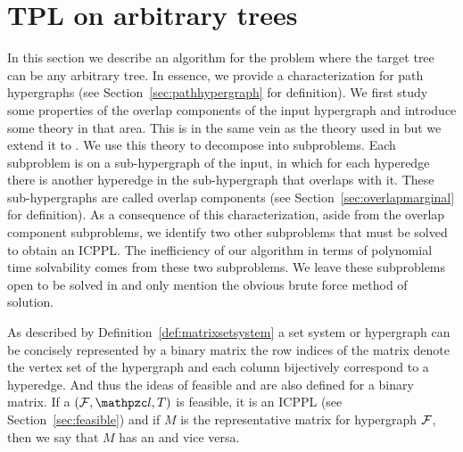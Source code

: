 \section{ TPL on arbitrary trees}
\label{sec:norestraint}

In this section we describe an algorithm for the \CFTPL problem where
the target tree can be any arbitrary tree. In essence, we provide a
characterization for path hypergraphs (see
Section~\ref{sec:pathhypergraph} for definition).  We first study some
properties of the overlap components of the input hypergraph and
introduce some theory in that area. This is in the same vein as the
theory used in \cite{wlh02,nsnrs09} but we extend it to \TPL.  We use
this theory to decompose \CFTPL into subproblems.  Each subproblem is
on a sub-hypergraph of the input, in which for each hyperedge there is
another hyperedge in the sub-hypergraph that overlaps with it. These
sub-hypergraphs are called overlap components (see
Section~\ref{sec:overlapmarginal} for definition). As a consequence of
this characterization, aside from the overlap component subproblems,
we identify two other subproblems that must be solved to obtain an
ICPPL.  The inefficiency of our algorithm in terms of polynomial time
solvability comes from these two subproblems. We leave these subproblems
open to be solved in \p and only mention the obvious brute force
method of solution.





As described by Definition~\ref{def:matrixsetsystem} a set system or
hypergraph can be concisely represented by a binary matrix \stt the
row indices of the matrix denote the vertex set of the hypergraph and
each column bijectively correspond to a hyperedge. And thus the ideas
of feasible \TPL and \ICPPL are also defined for a binary matrix. If a
\TPL $(\cF,\cl,T)$ is feasible, \ie it is an ICPPL (see
Section~\ref{sec:feasible}) and if $M$ is the representative matrix
for hypergraph ${\cal F}$, then we say that $M$ has an \ICPPL and vice
versa.


